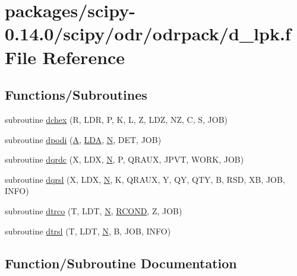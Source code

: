 \hypertarget{d__lpk_8f}{}\section{packages/scipy-\/0.14.0/scipy/odr/odrpack/d\+\_\+lpk.f File Reference}
\label{d__lpk_8f}
\subsection*{Functions/\+Subroutines}
\begin{DoxyCompactItemize}
\item 
subroutine \hyperlink{d__lpk_8f_a7a6e09b2d458510bb00fd110e13d8edf}{dchex} (R, L\+D\+R, P, K, L, Z, L\+D\+Z, N\+Z, C, S, J\+O\+B)
\item 
subroutine \hyperlink{d__lpk_8f_af9bde662e18ccd81fc8ac8c9e6a3b395}{dpodi} (\hyperlink{classA}{A}, \hyperlink{example__user_8c_ae946da542ce0db94dced19b2ecefd1aa}{L\+D\+A}, \hyperlink{polmisc_8c_a0240ac851181b84ac374872dc5434ee4}{N}, D\+E\+T, J\+O\+B)
\item 
subroutine \hyperlink{d__lpk_8f_aafc263cfeae42faf8282dd253b0b0fcc}{dqrdc} (X, L\+D\+X, \hyperlink{polmisc_8c_a0240ac851181b84ac374872dc5434ee4}{N}, P, Q\+R\+A\+U\+X, J\+P\+V\+T, W\+O\+R\+K, J\+O\+B)
\item 
subroutine \hyperlink{d__lpk_8f_a2245b8c23b6c0c087877e9eafcfc335c}{dqrsl} (X, L\+D\+X, \hyperlink{polmisc_8c_a0240ac851181b84ac374872dc5434ee4}{N}, K, Q\+R\+A\+U\+X, Y, Q\+Y, Q\+T\+Y, B, R\+S\+D, X\+B, J\+O\+B, I\+N\+F\+O)
\item 
subroutine \hyperlink{d__lpk_8f_a70f1471a5f449177231eb619d3bf7432}{dtrco} (T, L\+D\+T, \hyperlink{polmisc_8c_a0240ac851181b84ac374872dc5434ee4}{N}, \hyperlink{superlu__enum__consts_8h_af00a42ecad444bbda75cde1b64bd7e72a9b5c151728d8512307565994c89919d5}{R\+C\+O\+N\+D}, Z, J\+O\+B)
\item 
subroutine \hyperlink{d__lpk_8f_ad694b01fe416bf39b0ed91201939b017}{dtrsl} (T, L\+D\+T, \hyperlink{polmisc_8c_a0240ac851181b84ac374872dc5434ee4}{N}, B, J\+O\+B, I\+N\+F\+O)
\end{DoxyCompactItemize}


\subsection{Function/\+Subroutine Documentation}
\hypertarget{d__lpk_8f_a7a6e09b2d458510bb00fd110e13d8edf}{}
